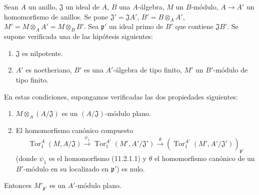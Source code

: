 \begin{lemma}[11.2.5]
\label{IV.11.2.5}
Sean $A$ un anillo, $\mathfrak J$ un ideal de $A$, $B$ una $A$-álgebra,
$M$ un $B$-módulo, $A\to A'$ un homomorfismo de anillos. Se pone
$\mathfrak J'=\mathfrak JA'$, $B'=B\otimes_AA'$,
$M'=M\otimes_AA'=M\otimes_BB'$. Sea $\mathfrak p'$ un ideal primo de
$B'$ que contiene $\mathfrak JB'$. Se supone verificada una de las hipótesis
siguientes:
\begin{enumerate}[label=\textit{\alph*)}]
\item $\mathfrak J$ es nilpotente.
\item $A'$ es noetheriano, $B'$ es una $A'$-álgebra de tipo finito, $M'$ un
$B'$-módulo de tipo finito.
\end{enumerate}
En estas condiciones, supongamos verificadas las dos propiedades siguientes:
\begin{enumerate}[label=\emph{(\roman*)}]
\item $M\otimes_A(A/\mathfrak J)$ es un $(A/\mathfrak J)$-módulo plano.
\item El homomorfismo canónico compuesto
\[
\operatorname{Tor}_1^A(M,A/\mathfrak J)\xrightarrow{\psi_1}
\operatorname{Tor}_1^{A'}(M',A'/\mathfrak J')\xrightarrow{\theta}
(\operatorname{Tor}_1^{A'}(M',A'/\mathfrak J'))_{\mathfrak p'}
\]
(donde $\psi_1$ es el homomorfismo (11.2.1.1) y $\theta$ el homomorfismo
canónico de un $B'$-módulo en su localizado en $\mathfrak p'$) es nulo.
\end{enumerate}
Entonces $M'_{\mathfrak p'}$ es un $A'$-módulo plano.
\end{lemma}

